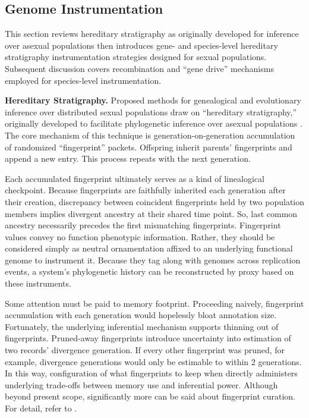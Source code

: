 \subsection{Genome Instrumentation}
\label{sec:genome-instrumentation}

This section reviews hereditary stratigraphy as originally developed for inference over asexual populations then introduces gene- and species-level hereditary stratigraphy instrumentation strategies designed for sexual populations.
Subsequent discussion covers recombination and ``gene drive'' mechanisms employed for species-level instrumentation.


% 
% 
\textbf{Hereditary Stratigraphy.}
Proposed methods for genealogical and evolutionary inference over distributed sexual populations draw on ``hereditary stratigraphy,'' originally developed to facilitate phylogenetic inference over asexual populations \citep{moreno2022hstrat}.
The core mechanism of this technique is generation-on-generation accumulation of randomized ``fingerprint'' packets.
Offspring inherit parents' fingerprints and append a new entry.
This process repeats with the next generation.

Each accumulated fingerprint ultimately serves as a kind of linealogical checkpoint.
Because fingerprints are faithfully inherited each generation after their creation, discrepancy between coincident fingerprints held by two population members implies divergent ancestry at their shared time point.
So, last common ancestry necessarily precedes the first mismatching fingerprints.
Fingerprint values convey no function phenotypic information.
Rather, they should be considered simply as neutral ornamentation affixed to an underlying functional genome to instrument it.
Because they tag along with genomes across replication events, a system's phylogenetic history can be reconstructed by proxy based on these instruments.

Some attention must be paid to memory footprint.
Proceeding naively, fingerprint accumulation with each generation would hopelessly bloat annotation size.
Fortunately, the underlying inferential mechanism supports thinning out of fingerprints.
Pruned-away fingerprints introduce uncertainty into estimation of two records' divergence generation.
If every other fingerprint was pruned, for example, divergence generations would only be estimable to within 2 generations.
In this way, configuration of what fingerprints to keep when directly administers underlying trade-offs between memory use and inferential power.
Although beyond present scope, significantly more can be said about fingerprint curation.
For detail, refer to \citep{moreno2022hereditary}.

